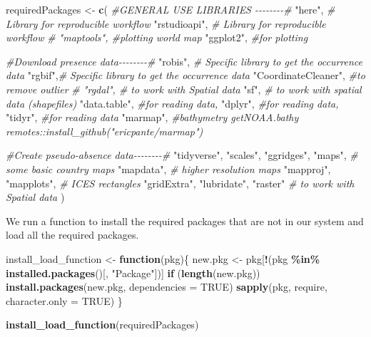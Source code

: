 \documentclass[
]{book}
\newenvironment{Shaded}{\begin{snugshade}}{\end{snugshade}}
\newcommand{\AttributeTok}[1]{\textcolor[rgb]{0.13,0.29,0.53}{#1}}
\newcommand{\CommentTok}[1]{\textcolor[rgb]{0.56,0.35,0.01}{\textit{#1}}}
\newcommand{\ConstantTok}[1]{\textcolor[rgb]{0.56,0.35,0.01}{#1}}
\newcommand{\ControlFlowTok}[1]{\textcolor[rgb]{0.13,0.29,0.53}{\textbf{#1}}}
\newcommand{\FunctionTok}[1]{\textcolor[rgb]{0.13,0.29,0.53}{\textbf{#1}}}
\newcommand{\NormalTok}[1]{#1}
\newcommand{\OtherTok}[1]{\textcolor[rgb]{0.56,0.35,0.01}{#1}}
\newcommand{\SpecialCharTok}[1]{\textcolor[rgb]{0.81,0.36,0.00}{\textbf{#1}}}
\newcommand{\StringTok}[1]{\textcolor[rgb]{0.31,0.60,0.02}{#1}}
\begin{document}
\begin{Shaded}
\begin{Highlighting}[]
\NormalTok{requiredPackages }\OtherTok{\textless{}{-}} \FunctionTok{c}\NormalTok{(}
  \CommentTok{\#GENERAL USE LIBRARIES {-}{-}{-}{-}{-}{-}{-}{-}\#}
  \StringTok{"here"}\NormalTok{, }\CommentTok{\# Library for reproducible workflow}
  \StringTok{"rstudioapi"}\NormalTok{,  }\CommentTok{\# Library for reproducible workflow}
  \CommentTok{\# "maptools", \#plotting world map}
  \StringTok{"ggplot2"}\NormalTok{, }\CommentTok{\#for plotting}
  
  \CommentTok{\#Download presence data{-}{-}{-}{-}{-}{-}{-}{-}\#}
  \StringTok{"robis"}\NormalTok{, }\CommentTok{\# Specific library to get the occurrence data}
  \StringTok{"rgbif"}\NormalTok{,}\CommentTok{\# Specific library to get the occurrence data}
  \StringTok{"CoordinateCleaner"}\NormalTok{, }\CommentTok{\#to remove outlier}
  \CommentTok{\# "rgdal", \# to work with Spatial data}
  \StringTok{"sf"}\NormalTok{, }\CommentTok{\# to work with spatial data (shapefiles)}
  \StringTok{"data.table"}\NormalTok{, }\CommentTok{\#for reading data,}
  \StringTok{"dplyr"}\NormalTok{, }\CommentTok{\#for reading data,}
  \StringTok{"tidyr"}\NormalTok{, }\CommentTok{\#for reading data}
  \StringTok{"marmap"}\NormalTok{, }\CommentTok{\#bathymetry getNOAA.bathy remotes::install\_github("ericpante/marmap")}
  
  \CommentTok{\#Create pseudo{-}absence data{-}{-}{-}{-}{-}{-}{-}{-}\#}
  \StringTok{"tidyverse"}\NormalTok{, }
  \StringTok{"scales"}\NormalTok{,}
  \StringTok{"ggridges"}\NormalTok{,}
  \StringTok{"maps"}\NormalTok{,     }\CommentTok{\# some basic country maps}
  \StringTok{"mapdata"}\NormalTok{,   }\CommentTok{\# higher resolution maps}
  \StringTok{"mapproj"}\NormalTok{,}
  \StringTok{"mapplots"}\NormalTok{,   }\CommentTok{\# ICES rectangles}
  \StringTok{"gridExtra"}\NormalTok{,}
  \StringTok{"lubridate"}\NormalTok{,}
  \StringTok{"raster"} \CommentTok{\# to work with Spatial data}
\NormalTok{    )}
\end{Highlighting}
\end{Shaded}

We run a function to install the required packages that are not in our system and load all the required packages.

\begin{Shaded}
\begin{Highlighting}[]
\NormalTok{install\_load\_function }\OtherTok{\textless{}{-}} \ControlFlowTok{function}\NormalTok{(pkg)\{}
\NormalTok{  new.pkg }\OtherTok{\textless{}{-}}\NormalTok{ pkg[}\SpecialCharTok{!}\NormalTok{(pkg }\SpecialCharTok{\%in\%} \FunctionTok{installed.packages}\NormalTok{()[, }\StringTok{"Package"}\NormalTok{])]}
  \ControlFlowTok{if}\NormalTok{ (}\FunctionTok{length}\NormalTok{(new.pkg))}
    \FunctionTok{install.packages}\NormalTok{(new.pkg, }\AttributeTok{dependencies =} \ConstantTok{TRUE}\NormalTok{)}
  \FunctionTok{sapply}\NormalTok{(pkg, require, }\AttributeTok{character.only =} \ConstantTok{TRUE}\NormalTok{)}
\NormalTok{\}}

\FunctionTok{install\_load\_function}\NormalTok{(requiredPackages)}
\end{Highlighting}
\end{Shaded}
\end{document}
